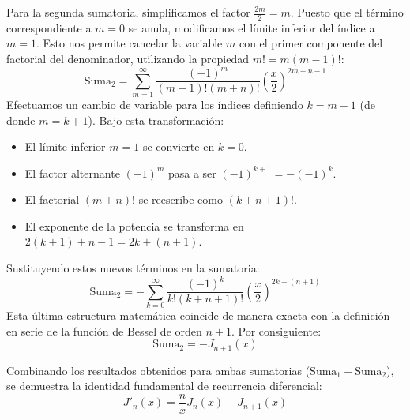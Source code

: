 \documentclass[11pt,a4paper]{article}
\begin{document}
Para la segunda sumatoria, simplificamos el factor $\frac{2m}{2} = m$. Puesto que el término correspondiente a $m=0$ se anula, modificamos el límite inferior del índice a $m=1$. Esto nos permite cancelar la variable $m$ con el primer componente del factorial del denominador, utilizando la propiedad $m! = m(m-1)!$:
\begin{equation}
	\text{Suma}_2 = \sum_{m=1}^{\infty} \frac{(-1)^m}{(m-1)!(m+n)!} \left(\frac{x}{2}\right)^{2m+n-1}
\end{equation}
Efectuamos un cambio de variable para los índices definiendo $k = m - 1$ (de donde $m = k + 1$). Bajo esta transformación:
\begin{itemize}
	\item El límite inferior $m=1$ se convierte en $k=0$.
	\item El factor alternante $(-1)^m$ pasa a ser $(-1)^{k+1} = -(-1)^k$.
	\item El factorial $(m+n)!$ se reescribe como $(k+n+1)!$.
	\item El exponente de la potencia se transforma en $2(k+1)+n-1 = 2k+(n+1)$.
\end{itemize}
Sustituyendo estos nuevos términos en la sumatoria:
\begin{equation}
	\text{Suma}_2 = -\sum_{k=0}^{\infty} \frac{(-1)^k}{k!(k+n+1)!} \left(\frac{x}{2}\right)^{2k+(n+1)}
\end{equation}
Esta última estructura matemática coincide de manera exacta con la definición en serie de la función de Bessel de orden $n+1$. Por consiguiente:
\begin{equation}
	\text{Suma}_2 = -J_{n+1}(x)
\end{equation}

Combinando los resultados obtenidos para ambas sumatorias ($\text{Suma}_1 + \text{Suma}_2$), se demuestra la identidad fundamental de recurrencia diferencial:
\begin{equation}
	J'_n(x) = \frac{n}{x} J_n(x) - J_{n+1}(x)
\end{equation}
\end{document}
